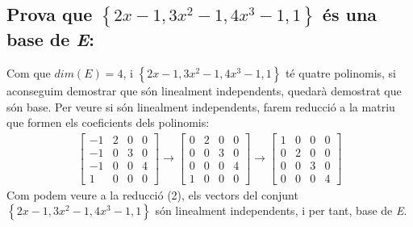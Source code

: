\documentclass[a4paper, 11pt]{article}
\begin{document}
        \subsection{Prova que ${\left\{2x-1, 3x^2-1, 4x^3-1, 1\right\}}$ \'es una base de \emph{E}:}
            Com que ${dim(E) = 4}$, i ${\left\{2x-1, 3x^2-1, 4x^3-1, 1\right\}}$ t\'e quatre polinomis, si aconseguim demostrar que s\'on linealment independents, quedar\`a demostrat que s\'on base. Per veure si s\'on linealment independents, farem reducci\'o a la matriu que formen els coeficients dels polinomis:
            \begin{align}
                \begin{bmatrix}
                    -1 & 2 & 0 & 0\\
                    -1 & 0 & 3 & 0\\
                    -1 & 0 & 0 & 4\\
                    1 & 0 & 0 & 0
                \end{bmatrix}
                \longrightarrow
                \begin{bmatrix}
                    0 & 2 & 0 & 0\\
                    0 & 0 & 3 & 0\\
                    0 & 0 & 0 & 4\\
                    1 & 0 & 0 & 0
                \end{bmatrix}
                \longrightarrow
                \begin{bmatrix}
                    1 & 0 & 0 & 0\\
                    0 & 2 & 0 & 0\\
                    0 & 0 & 3 & 0\\
                    0 & 0 & 0 & 4
                \end{bmatrix}
            \end{align}
            Com podem veure a la reducci\'o (2), els vectors del conjunt ${\left\{2x-1, 3x^2-1, 4x^3-1, 1\right\}}$ s\'on linealment independents, i per tant, base de \emph{E}.
\end{document}
